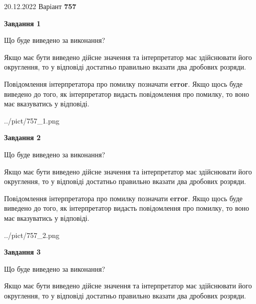 \documentclass[12pt, ukrainian]{article}
\begin{document}
{20.12.2022 Варіант \No \textbf { 757 }\par}
{
\begin {Large}

{\begin {center}\textbf{Завдання 1}\end {center}}\par
Що буде виведено за виконання? \par

Якщо має бути виведено дійсне значення та інтерпретатор має здійснювати його округлення, 
то у відповіді достатньо правильно вказати два дробових розряди.

Повідомлення інтерпретатора про помилку позначати \textbf{error}.
Якщо щось буде виведено до того, як інтерпретатор видасть повідомлення про помилку, 
то воно має вказуватись у відповіді. \par

\begin{center}
	{../pict/757_1.png}
\end{center}
\newpage

{\begin {center}\textbf{Завдання 2}\end {center}}\par
Що буде виведено за виконання? \par

Якщо має бути виведено дійсне значення та інтерпретатор має здійснювати його округлення, 
то у відповіді достатньо правильно вказати два дробових розряди.

Повідомлення інтерпретатора про помилку позначати \textbf{error}.
Якщо щось буде виведено до того, як інтерпретатор видасть повідомлення про помилку, 
то воно має вказуватись у відповіді. \par

\begin{center}
	{../pict/757_2.png}
\end{center}
\newpage

{\begin {center}\textbf{Завдання 3}\end {center}}\par
Що буде виведено за виконання? \par

Якщо має бути виведено дійсне значення та інтерпретатор має здійснювати його округлення, 
то у відповіді достатньо правильно вказати два дробових розряди.


\end{Large}}
\end{document}
